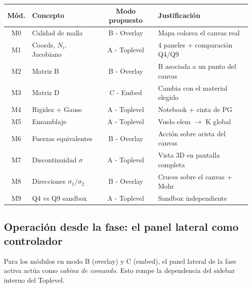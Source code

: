\documentclass[11pt,a4paper]{article}
\begin{document}
\begin{center}
\renewcommand{\arraystretch}{1.25}
\begin{tabular}{@{}c l c l@{}}
\toprule
\textbf{Mód.} & \textbf{Concepto} & \textbf{Modo propuesto} & \textbf{Justificación} \\
\midrule
M0 & Calidad de malla        & B - Overlay   & Mapa colorea el canvas real \\
M1 & Coords, $N_i$, Jacobiano & A - Toplevel  & 4 paneles + comparación Q4/Q9 \\
M2 & Matriz B                & B - Overlay   & B asociada a un punto del canvas \\
M3 & Matriz D                & C - Embed     & Cambia con el material elegido \\
M4 & Rigidez + Gauss         & A - Toplevel  & Notebook + cinta de PG \\
M5 & Ensamblaje              & A - Toplevel  & Vuelo elem $\rightarrow$ K global \\
M6 & Fuerzas equivalentes    & B - Overlay   & Acción sobre arista del canvas \\
M7 & Discontinuidad $\sigma$ & A - Toplevel  & Vista 3D en pantalla completa \\
M8 & Direcciones $\sigma_1/\sigma_2$ & B - Overlay & Cruces sobre el canvas + Mohr \\
M9 & Q4 vs Q9 sandbox        & A - Toplevel  & Sandbox independiente \\
\bottomrule
\end{tabular}
\end{center}

\subsection{Operación desde la fase: el panel lateral como controlador}

Para los módulos en modo B (overlay) y C (embed), el panel lateral de la
fase activa actúa como \emph{cabina de comando}. Esto rompe la dependencia
del sidebar interno del Toplevel.
\end{document}
